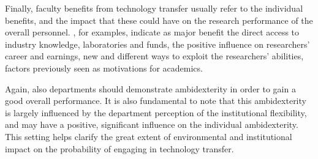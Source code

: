 Finally, faculty benefits from technology transfer usually refer to the individual benefits, and the impact that these could have on the research performance of the overall personnel. \citet{Baldini2007}, for examples, indicate as major benefit the direct access to industry knowledge, laboratories and funds, the positive influence on researchers' career and earnings, new and different ways to exploit the researchers' abilities, factors previously seen as motivations for academics.

Again, also departments should demonstrate ambidexterity in order to gain a good overall performance. It is also fundamental to note that this ambidexterity is largely influenced by the department perception of the institutional flexibility, and may have a positive, significant influence on the individual ambidexterity. This setting helps clarify the great extent of environmental and institutional impact on the probability of engaging in technology transfer.
